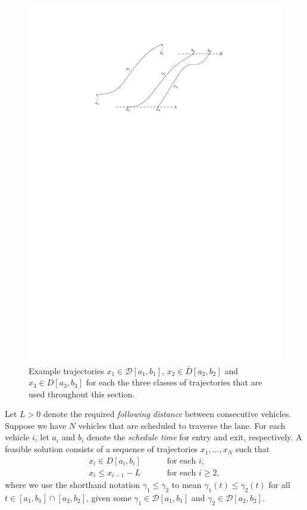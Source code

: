 \documentclass[a4paper]{article}
\theoremstyle{definition}
\theoremstyle{plain}
\begin{document}
\begin{figure}
  \centering
  \includegraphics[scale=1]{figures/motion/rough/trajectories}
  \caption{Example trajectories $x_{1} \in \mathcal{D}[a_{1},b_{1}]$,
    $x_{2} \in \bar{D}[a_{2},b_{2}]$ and $x_{3} \in D[a_{3},b_{3}]$ for each the
    three classes of trajectories that are used throughout this section.}%
  \label{fig:trajectories}
\end{figure}

Let $L > 0$ denote the required \textit{following distance} between consecutive
vehicles.
%
Suppose we have $N$ vehicles that are scheduled to traverse the lane. For each
vehicle $i$, let $a_{i}$ and $b_{i}$ denote the \textit{schedule time} for entry
and exit, respectively. A feasible solution consists of a sequence of
trajectories $x_{1}, \dots, x_{N}$ such that
\begin{subequations}\label{eq:feasibility}
\begin{align}
x_{i} \in D[a_{i}, b_{i}] \quad \quad & \text{ for each } i, \\
x_{i} \leq x_{i-1} - L \quad \quad &\text{ for each } i \geq 2,
\end{align}
\end{subequations}
%
where we use the shorthand notation $\gamma_{1} \leq \gamma_{2}$ to mean
$\gamma_{1}(t) \leq \gamma_{2}(t)$ for all
$t \in [a_{1}, b_{1}] \cap [a_{2}, b_{2}]$, given some
$\gamma_{1} \in \mathcal{D}[a_{1}, b_{1}]$ and
$\gamma_{2} \in \mathcal{D}[a_{2}, b_{2}]$.
\end{document}
